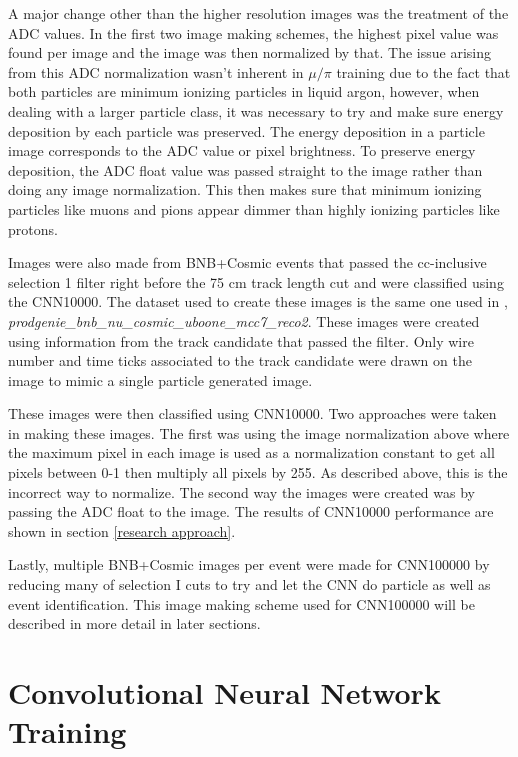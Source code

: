 A major change other than the higher resolution images was the treatment of the ADC values. In the first two image making schemes, the highest pixel value was found per image and the image was then normalized by that. The issue arising from this ADC normalization wasn't inherent in $\mu/\pi$ training due to the fact that both particles are minimum ionizing particles in liquid argon, however, when dealing with a larger particle class, it was necessary to try and make sure energy deposition by each particle was preserved. The energy deposition in a particle image corresponds to the ADC value or pixel brightness. To preserve energy deposition, the ADC float value was passed straight to the image rather than doing any image normalization. This then makes sure that minimum ionizing particles like muons and pions appear dimmer than highly ionizing particles like protons.  

Images were also made from BNB+Cosmic events that passed the cc-inclusive selection 1 filter right before the 75 cm track length cut and were classified using the CNN10000. The dataset used to create these images is the same one used in \cite{cc-inclusive}, \textit{prodgenie{\_}bnb{\_}nu{\_}cosmic{\_}uboone{\_}mcc7{\_}reco2}. These images were created using information from the track candidate that passed the filter. Only wire number and time ticks associated to the track candidate were drawn on the image to mimic a single particle generated image. 

These images were then classified using CNN10000. Two approaches were taken in making these images. The first was using the image normalization above where the maximum pixel in each image is used as a normalization constant to get all pixels between 0-1 then multiply all pixels by 255. As described above, this is the incorrect way to normalize. The second way the images were created was by passing the ADC float to the image. The results of CNN10000 performance are shown in section \ref{research approach}. 

Lastly, multiple BNB+Cosmic images per event were made for CNN100000 by reducing many of selection I cuts to try and let the CNN do particle as well as event identification. This image making scheme used for CNN100000 will be described in more detail in later sections. 

\section{Convolutional Neural Network Training}
